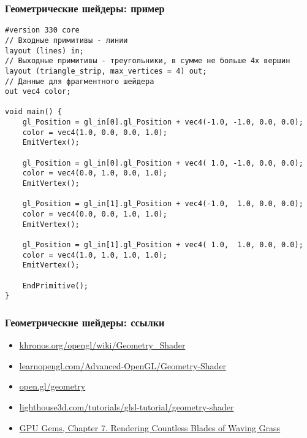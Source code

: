 \documentclass{beamer}
\begin{document}
\begin{frame}[fragile]
\frametitle{Геометрические шейдеры: пример}
\fontsize{8pt}{8pt}
\begin{verbatim}
#version 330 core
// Входные примитивы - линии
layout (lines) in;
// Выходные примитивы - треугольники, в сумме не больше 4х вершин
layout (triangle_strip, max_vertices = 4) out;
// Данные для фрагментного шейдера
out vec4 color;
  
void main() {
    gl_Position = gl_in[0].gl_Position + vec4(-1.0, -1.0, 0.0, 0.0);
    color = vec4(1.0, 0.0, 0.0, 1.0);
    EmitVertex();

    gl_Position = gl_in[0].gl_Position + vec4( 1.0, -1.0, 0.0, 0.0);
    color = vec4(0.0, 1.0, 0.0, 1.0);
    EmitVertex();

    gl_Position = gl_in[1].gl_Position + vec4(-1.0,  1.0, 0.0, 0.0);
    color = vec4(0.0, 0.0, 1.0, 1.0);
    EmitVertex();

    gl_Position = gl_in[1].gl_Position + vec4( 1.0,  1.0, 0.0, 0.0);
    color = vec4(1.0, 1.0, 1.0, 1.0);
    EmitVertex();

    EndPrimitive();
} 
\end{verbatim}
\end{frame}

\begin{frame}[fragile]
\frametitle{Геометрические шейдеры: ссылки}
\begin{itemize}
\item \href{https://www.khronos.org/opengl/wiki/Geometry_Shader}{khronos.org/opengl/wiki/Geometry\_Shader}
\item \href{https://learnopengl.com/Advanced-OpenGL/Geometry-Shader}{learnopengl.com/Advanced-OpenGL/Geometry-Shader}
\item \href{https://open.gl/geometry}{open.gl/geometry}
\item \href{https://www.lighthouse3d.com/tutorials/glsl-tutorial/geometry-shader}{lighthouse3d.com/tutorials/glsl-tutorial/geometry-shader}
\item \href{https://developer.download.nvidia.com/books/HTML/gpugems/gpugems_ch07.html}{GPU Gems, Chapter 7. Rendering Countless Blades of Waving Grass}
\end{itemize}
\end{frame}
\end{document}
